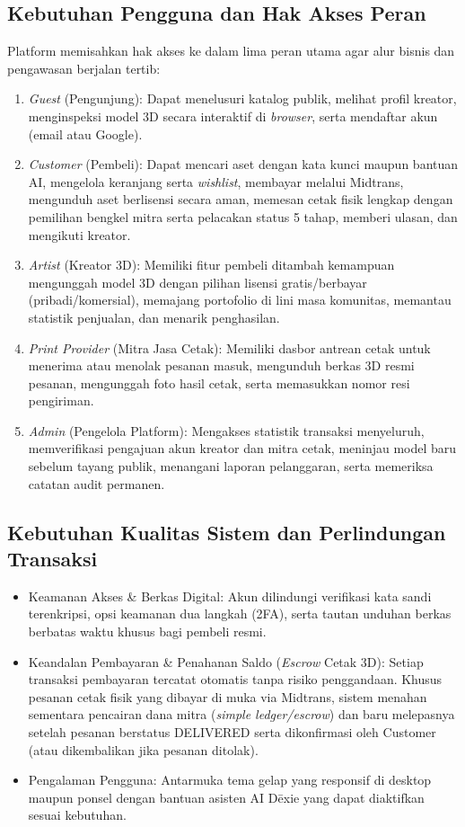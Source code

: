 \documentclass[11pt,a4paper]{article}
\begin{document}
\subsection{Kebutuhan Pengguna dan Hak Akses Peran}
Platform memisahkan hak akses ke dalam lima peran utama agar alur bisnis dan pengawasan berjalan tertib:
\begin{enumerate}[leftmargin=1.5em, itemsep=2pt]
    \item \textit{Guest} (Pengunjung): Dapat menelusuri katalog publik, melihat profil kreator, menginspeksi model 3D secara interaktif di \textit{browser}, serta mendaftar akun (email atau Google).
    \item \textit{Customer} (Pembeli): Dapat mencari aset dengan kata kunci maupun bantuan AI, mengelola keranjang serta \textit{wishlist}, membayar melalui Midtrans, mengunduh aset berlisensi secara aman, memesan cetak fisik lengkap dengan pemilihan bengkel mitra serta pelacakan status 5 tahap, memberi ulasan, dan mengikuti kreator.
    \item \textit{Artist} (Kreator 3D): Memiliki fitur pembeli ditambah kemampuan mengunggah model 3D dengan pilihan lisensi gratis/berbayar (pribadi/komersial), memajang portofolio di lini masa komunitas, memantau statistik penjualan, dan menarik penghasilan.
    \item \textit{Print Provider} (Mitra Jasa Cetak): Memiliki dasbor antrean cetak untuk menerima atau menolak pesanan masuk, mengunduh berkas 3D resmi pesanan, mengunggah foto hasil cetak, serta memasukkan nomor resi pengiriman.
    \item \textit{Admin} (Pengelola Platform): Mengakses statistik transaksi menyeluruh, memverifikasi pengajuan akun kreator dan mitra cetak, meninjau model baru sebelum tayang publik, menangani laporan pelanggaran, serta memeriksa catatan audit permanen.
\end{enumerate}

\subsection{Kebutuhan Kualitas Sistem dan Perlindungan Transaksi}
\begin{itemize}[leftmargin=1.5em, itemsep=2pt]
    \item Keamanan Akses \& Berkas Digital: Akun dilindungi verifikasi kata sandi terenkripsi, opsi keamanan dua langkah (2FA), serta tautan unduhan berkas berbatas waktu khusus bagi pembeli resmi.
    \item Keandalan Pembayaran \& Penahanan Saldo (\textit{Escrow} Cetak 3D): Setiap transaksi pembayaran tercatat otomatis tanpa risiko penggandaan. Khusus pesanan cetak fisik yang dibayar di muka via Midtrans, sistem menahan sementara pencairan dana mitra (\textit{simple ledger/escrow}) dan baru melepasnya setelah pesanan berstatus DELIVERED serta dikonfirmasi oleh Customer (atau dikembalikan jika pesanan ditolak).
    \item Pengalaman Pengguna: Antarmuka tema gelap yang responsif di desktop maupun ponsel dengan bantuan asisten AI D\={e}xie yang dapat diaktifkan sesuai kebutuhan.
\end{itemize}
\end{document}
